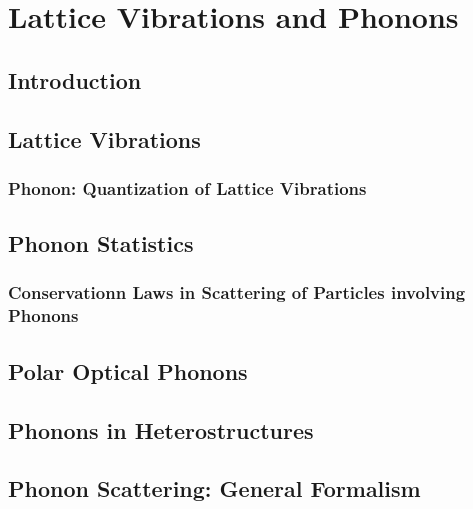 \chapter{Lattice Vibrations and Phonons}

\section{Introduction}
\section{Lattice Vibrations}
\subsection{Phonon: Quantization of Lattice Vibrations}

\section{Phonon Statistics}
\subsection{Conservationn Laws in Scattering of Particles involving Phonons}
\section{Polar Optical Phonons}
\section{Phonons in Heterostructures}
\section{Phonon Scattering: General Formalism}
